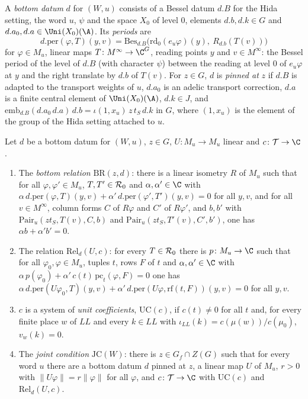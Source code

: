 \begin{definition}\label{pf:open0a:def:bottom}
A \emph{bottom datum} $d$ for $(W,u)$ consists of a Bessel datum $d.B$ for the Hida setting, the word $u$, $\psi$ and
the space $X_0$ of level $0$, elements $d.b,d.k\in G$ and $d.a_0,d.a\in\Uni(X_0)(\A)$. Its \emph{periods} are
\[
d.\mathrm{per}(\varphi,T)(y,v)=\mathrm{Bes}_{d.B}\bigl(\mathrm{rd}_0(e_u\varphi)(y),\ R_{d.b}(T(v))\bigr)
\]
for $\varphi\in M_u$, linear maps $T\colon M^{\infty}\to\C^G$, reading points $y$ and $v\in M^{\infty}$: the
Bessel period of the level of $d.B$ (with character $\psi$) between the reading at level $0$ of $e_u\varphi$ at $y$
and the right translate by $d.b$ of $T(v)$. For $z\in G$, $d$ is \emph{pinned at} $z$ if $d.B$ is adapted to the
transport weights of $u$, $d.a_0$ is an adelic transport correction, $d.a$ is a finite central element of
$\Uni(X_0)(\A)$, $d.k\in J$, and $\mathrm{emb}_{d.B}(d.a_0\,d.a)\,d.b=\iota(1,x_u)\,z\,t_S\,d.k$ in $G$, where
$(1,x_u)$ is the element of the group of the Hida setting attached to $u$.
\ 
\end{definition}

\begin{definition}[Relations]\label{pf:open0a:def:rel}
Let $d$ be a bottom datum for $(W,u)$, $z\in G$, $U\colon M_u\to M_u$ linear and $c\colon\mathcal T\to\C$.
\begin{enumerate}[label=(\alph*)]
\item The \emph{bottom relation} $\mathrm{BR}(z,d)$: there is a linear isometry $R$ of $M_u$ such that for all
$\varphi,\varphi'\in M_u$, $T,T'\in\mathcal{R}_0$ and $\alpha,\alpha'\in\C$ with
$\alpha\,d.\mathrm{per}(\varphi,T)(y,v)+\alpha'\,d.\mathrm{per}(\varphi',T')(y,v)=0$ for all $y,v$, and for all
$v\in M^{\infty}$, column forms $C$ of $R\varphi$ and $C'$ of $R\varphi'$, and $b,b'$ with
$\mathrm{Pair}_u(zt_S,T(v),C,b)$ and $\mathrm{Pair}_u(zt_S,T'(v),C',b')$, one has $\alpha b+\alpha'b'=0$.
\item The relation $\mathrm{Rel}_d(U,c)$: for every $T\in\mathcal{R}_0$ there is $p\colon M_u\to\C$ such that for all
$\varphi_0,\varphi\in M_u$, tuples $t$, rows $F$ of $t$ and $\alpha,\alpha'\in\C$ with
$\alpha\,p(\varphi_0)+\alpha'\,c(t)\,\mathrm{pc}_t(\varphi,F)=0$ one has
$\alpha\,d.\mathrm{per}(U\varphi_0,T)(y,v)+\alpha'\,d.\mathrm{per}(U\varphi,\mathrm{rf}(t,F))(y,v)=0$ for all $y,v$.
\item $c$ is a system of \emph{unit coefficients}, $\mathrm{UC}(c)$, if $c(t)\ne0$ for all $t$ and, for every finite
place $w$ of $\mathit{LL}$ and every $k\in\mathit{LL}$ with $\iota_{\mathit{LL}}(k)=c(\mu(w))/c(\mu_0)$, $v_w(k)=0$.
\item The \emph{joint condition} $\mathrm{JC}(W)$: there is $z\in G_f\cap Z(G)$ such that for every word $u$ there are a
bottom datum $d$ pinned at $z$, a linear map $U$ of $M_u$, $r>0$ with $\|U\varphi\|=r\|\varphi\|$ for all $\varphi$, and
$c\colon\mathcal T\to\C$ with $\mathrm{UC}(c)$ and $\mathrm{Rel}_d(U,c)$.
\end{enumerate}
\ 
\end{definition}

